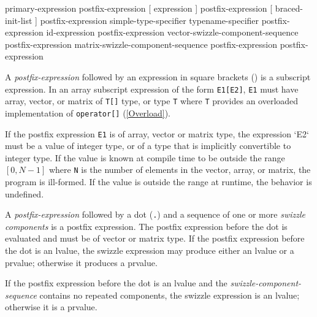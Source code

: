 
\begin{grammar}
  \br
  primary-expression\br
  postfix-expression [ expression ]\br
  postfix-expression [ braced-init-list ]\br %
  postfix-expression \terminal{(}  \terminal{)}\br
  simple-type-specifier \terminal{(}  \terminal{)}\br
  typename-specifier \terminal{(}  \terminal{)}\br
  postfix-expression   id-expression\br
  postfix-expression  vector-swizzle-component-sequence\br
  postfix-expression  matrix-swizzle-component-sequence\br
  postfix-expression \terminal{++}\br
  postfix-expression \terminal{--}
\end{grammar}


\p A \textit{postfix-expression} followed by an expression in square brackets
(\texttt{\lbrack \rbrack}) is a subscript expression. In an array subscript
expression of the form \texttt{E1[E2]}, \texttt{E1} must have array, vector, or
matrix of \texttt{T[]} type, or type \texttt{T} where \texttt{T} provides an
overloaded implementation of \texttt{operator[]} (\ref{Overload}).

\p If the postfix expression \texttt{E1} is of array, vector or matrix type, the
expression `E2` must be a value of integer type, or of a type that is
implicitly convertible to integer type. If the value is known at compile
time to be outside the range \([0, N-1]\) where \texttt{N} is the number of
elements in the vector, array, or matrix, the program is ill-formed. If the
value is outside the range at runtime, the behavior is undefined.


\p A \textit{postfix-expression} followed by a dot (\texttt{.}) and a sequence
of one or more \textit{swizzle components} is a postfix expression. The postfix
expression before the dot is evaluated and must be of vector or matrix type. If
the postfix expression before the dot is an lvalue, the swizzle expression may
produce either an lvalue or a prvalue; otherwise it produces a prvalue.

\p If the postfix expression before the dot is an lvalue and the
\textit{swizzle-component-sequence} contains no repeated components, the swizzle
expression is an lvalue; otherwise it is a prvalue.

